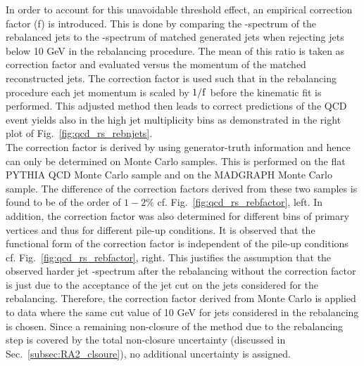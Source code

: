 In order to account for this unavoidable threshold effect, an empirical correction factor (f) is introduced. This is done by comparing the \pt-spectrum of the rebalanced jets to the \pt-spectrum of matched generated jets when rejecting jets below 10 GeV in the rebalancing procedure. The mean of this ratio is taken as correction factor and evaluated versus the momentum of the matched reconstructed jets. The correction factor is used such that in the rebalancing procedure each jet momentum is scaled by $1/\rm{f}$ before the kinematic fit is performed. This adjusted method then leads to correct predictions of the QCD event yields also in the high jet multiplicity bins as demonstrated in the right plot of Fig.~\ref{fig:qcd_rs_rebnjets}.\\
The correction factor is derived by using generator-truth information and hence can only be determined on Monte Carlo samples. This is performed on the flat PYTHIA QCD Monte Carlo sample and on the MADGRAPH Monte Carlo sample. The difference of the correction factors derived from these two samples is found to be of the order of $1-2\%$ cf. Fig.~\ref{fig:qcd_rs_rebfactor}, left. In addition, the correction factor was also determined for different bins of primary vertices and thus for different pile-up conditions. It is observed that the functional form of the correction factor is independent of the pile-up conditions cf. Fig.~\ref{fig:qcd_rs_rebfactor}, right. This justifies the assumption that the observed harder jet \pt-spectrum after the rebalancing without the correction factor is just due to the acceptance of the jet \pt cut on the jets considered for the rebalancing. Therefore, the correction factor derived from Monte Carlo is applied to data where the same \pt cut value of 10 GeV for jets considered in the rebalancing is chosen. Since a remaining non-closure of the method due to the rebalancing step is covered by the total non-closure uncertainty (discussed in Sec.~\ref{subsec:RA2_clsoure}), no additional uncertainty is assigned. 

